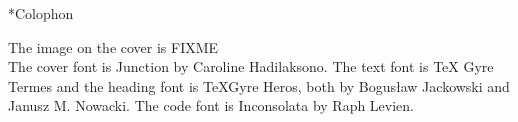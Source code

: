 \begin{chapter}*{Colophon}

The image on the cover is FIXME\\

\noindent
The cover font is Junction by Caroline Hadilaksono.  The text font is \TeX
Gyre Termes and the heading font is \TeX Gyre Heros, both by Bogus\l{}aw
Jackowski and Janusz M. Nowacki.  The code font is Inconsolata by Raph Levien.

\end{chapter}

\pagebreak
\thispagestyle{empty}
\mbox{}

